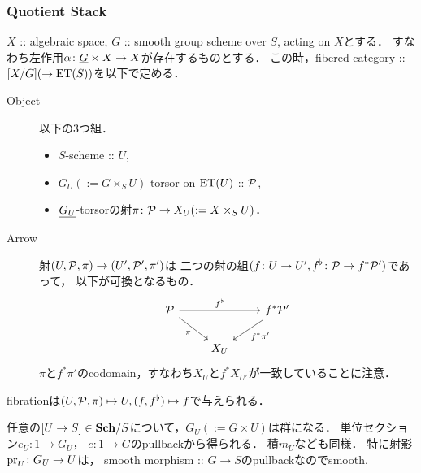     \subsubsection{Quotient Stack}
    \begin{Def}
        $X$ :: algebraic space,
        $G$ :: smooth group scheme over $S$, acting on $X$とする．
        すなわち左作用$\alpha \colon \underline{G} \times X \to X$が存在するものとする．
        この時，fibered category :: $[X/G](\to \mathrm{ET}(S))$を以下で定める．

        \begin{description}
            \item[Object]
                以下の$3$つ組．
                \begin{itemize}
                    \item $S$-scheme :: $U$,
                    \item $G_{U}(:=G \times_{S} U)$-torsor on $\mathrm{ET}(U)$ :: $\mathcal{P}$,
                    \item $\underline{G_U}$-torsorの射$\pi \colon \mathcal{P} \to X_U(:=X \times_{S} U)$．
                \end{itemize}
            \item[Arrow]
                射$(U, \mathcal{P}, \pi) \to (U', \mathcal{P}', \pi')$は
                二つの射の組$(f \colon U \to U', f^{\flat} \colon \mathcal{P} \to f^*\mathcal{P}')$であって，
                以下が可換となるもの．
                \[
                \begin{tikzcd}
                    \shP \ar[rr, "f^{\flat}"]\ar[rd, "\pi"']& {} & f^*\shP' \ar[ld, "f^*\pi'"]\\
                    {} & X_{U} & {}
                \end{tikzcd}
                \]
                $\pi$と$f^*\pi'$のcodomain，すなわち$X_U$と$f^*X_{U'}$が一致していることに注意．
        \end{description}
        fibrationは$(U, \mathcal{P}, \pi) \mapsto U, (f, f^{\flat}) \mapsto f$で与えられる．
    \end{Def}

    \begin{Remark}\label{rem:GU}
        任意の$[U \to S] \in \mathbf{Sch}/S$について，$G_{U}(:=G \times U)$は群になる．
        単位セクション$e_U \colon 1 \to G_{U}$，
        $e \colon 1 \to G$のpullbackから得られる．
        積$m_U$なども同様．
        特に射影$\operatorname{pr}_{U} \colon G_{U} \to U$は，
        smooth morphism :: $G \to S$のpullbackなのでsmooth.
    \end{Remark}

